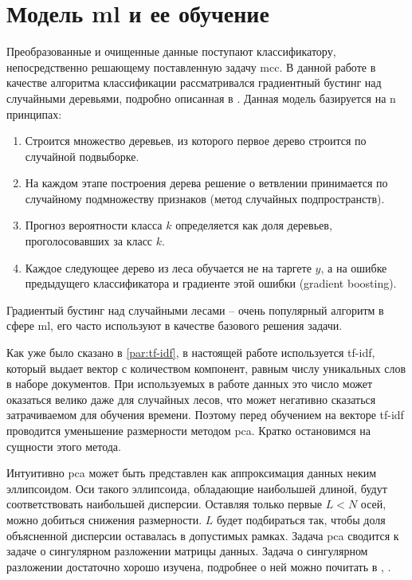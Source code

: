 \section{Модель \acrshort{ml} и ее обучение}
\label{sec:training}
Преобразованные и очищенные данные поступают классификатору, непосредственно решающему поставленную задачу \acrlong{mcc}.
В данной работе в качестве алгоритма классификации рассматривался градиентный бустинг над случайными деревьями, подробно описанная в \cite{cite:xgboost}.
Данная модель базируется на n принципах:
\begin{enumerate}
    \item Строится множество деревьев, из которого первое дерево строится по случайной подвыборке.
    \item На каждом этапе построения дерева решение о ветвлении принимается по случайному подмножеству признаков (метод случайных подпространств).
    \item Прогноз вероятности класса $k$ определяется как доля деревьев, проголосовавших за класс $k$.
    \item Каждое следующее дерево из леса обучается не на таргете $y$, а на ошибке предыдущего классификатора и градиенте этой ошибки (gradient boosting).
\end{enumerate}
Градиентый бустинг над случайными лесами -- очень популярный алгоритм в сфере \acrshort{ml}, его часто используют в качестве базового решения задачи.

Как уже было сказано в \ref{par:tf-idf}, в настоящей работе используется \acrshort{tf-idf}, который выдает вектор с количеством компонент, равным числу уникальных слов в наборе документов.
При используемых в работе данных это число может оказаться велико даже для случайных лесов, что может негативно сказаться затрачиваемом для обучения времени.
Поэтому перед обучением на векторе \acrshort{tf-idf} проводится уменьшение размерности методом \gls{pca}.
Кратко остановимся на сущности этого метода.

Интуитивно \gls{pca} может быть представлен как аппроксимация данных неким эллипсоидом.
Оси такого эллипсоида, обладающие наибольшей длиной, будут соответствовать наибольшей дисперсии.
Оставляя только первые $L < N$ осей, можно добиться снижения размерности.
$L$ будет подбираться так, чтобы доля объясненной дисперсии оставалась в допустимых рамках.
Задача \gls{pca} сводится к задаче о сингулярном разложении матрицы данных.
Задача о сингулярном разложении достаточно хорошо изучена, подробнее о ней можно почитать в \cite{cite:svd-1}, \cite{cite:svd-2}.

